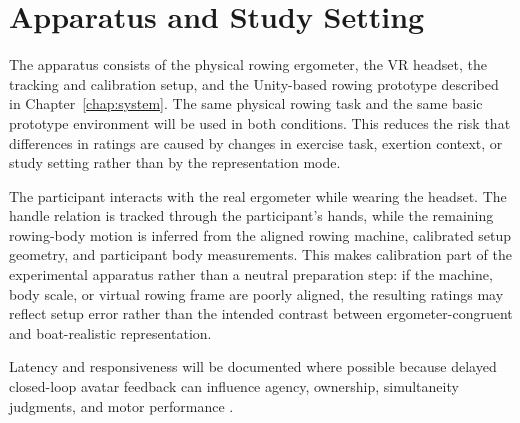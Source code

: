 \section{Apparatus and Study Setting}
\label{sec:study_design_apparatus}

The apparatus consists of the physical rowing ergometer, the VR headset, the tracking and calibration setup, and the Unity-based rowing prototype described in Chapter~\ref{chap:system}. The same physical rowing task and the same basic prototype environment will be used in both conditions. This reduces the risk that differences in ratings are caused by changes in exercise task, exertion context, or study setting rather than by the representation mode.


The participant interacts with the real ergometer while wearing the headset. The handle relation is tracked through the participant's hands, while the remaining rowing-body motion is inferred from the aligned rowing machine, calibrated setup geometry, and participant body measurements. This makes calibration part of the experimental apparatus rather than a neutral preparation step: if the machine, body scale, or virtual rowing frame are poorly aligned, the resulting ratings may reflect setup error rather than the intended contrast between ergometer-congruent and boat-realistic representation.


Latency and responsiveness will be documented where possible because delayed closed-loop avatar feedback can influence agency, ownership, simultaneity judgments, and motor performance \parencite{waltemateEtAl2016latency}.
